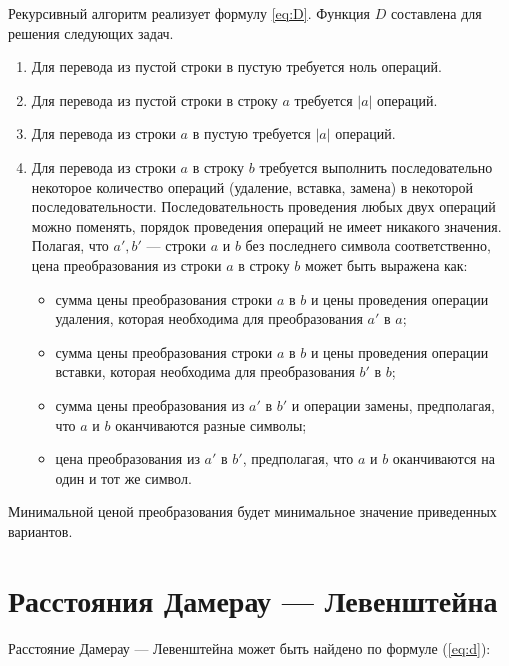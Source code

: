 \documentclass[12pt]{report}
\begin{document}
Рекурсивный алгоритм реализует формулу \ref{eq:D}.
Функция $D$ составлена для решения следующих задач.
\begin{enumerate}
	\item Для перевода из пустой строки в пустую требуется ноль операций.
	\item Для перевода из пустой строки в строку $a$ требуется $|a|$ операций.
	\item Для перевода из строки $a$ в пустую требуется $|a|$ операций.
	\item Для перевода из строки $a$ в строку $b$ требуется выполнить последовательно некоторое количество операций (удаление, вставка, замена) в некоторой последовательности. Последовательность проведения любых двух операций можно поменять, порядок проведения операций не имеет никакого значения. Полагая, что $a', b'$  — строки $a$ и $b$ без последнего символа соответственно, цена преобразования из строки $a$ в строку $b$ может быть выражена как:
	\begin{itemize}
		\item сумма цены преобразования строки $a$ в $b$ и цены проведения операции удаления, которая необходима для преобразования $a'$ в $a$;
		\item сумма цены преобразования строки $a$ в $b$  и цены проведения операции вставки, которая необходима для преобразования $b'$ в $b$;
		\item сумма цены преобразования из $a'$ в $b'$ и операции замены, предполагая, что $a$ и $b$ оканчиваются разные символы;
		\item цена преобразования из $a'$ в $b'$, предполагая, что $a$ и $b$ оканчиваются на один и тот же символ.
	\end{itemize}
\end{enumerate}

	Минимальной ценой преобразования будет минимальное	значение приведенных вариантов.

\section{Расстояния Дамерау — Левенштейна}

Расстояние Дамерау — Левенштейна может быть найдено по формуле (\ref{eq:d}):
\end{document}
